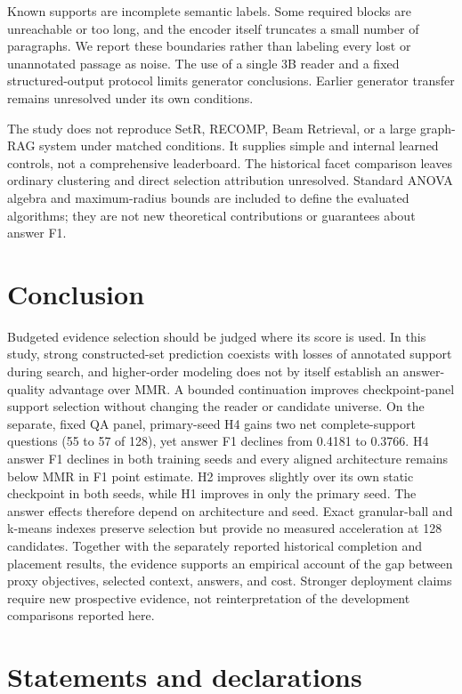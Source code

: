 \documentclass[pdflatex,sn-mathphys-num]{sn-jnl}
\begin{document}
Known supports are incomplete semantic labels. Some required blocks are
unreachable or too long, and the encoder itself truncates a small number of
paragraphs. We report these boundaries rather than labeling every lost or
unannotated passage as noise. The use of a single 3B reader and a fixed
structured-output protocol limits generator conclusions. Earlier generator
transfer remains unresolved under its own conditions.

The study does not reproduce SetR, RECOMP, Beam Retrieval, or a large
graph-RAG system under matched conditions. It supplies simple and internal
learned controls, not a comprehensive leaderboard. The historical facet
comparison leaves ordinary clustering and direct selection attribution
unresolved. Standard ANOVA algebra and maximum-radius bounds are included
to define the evaluated algorithms; they are not new theoretical
contributions or guarantees about answer F1.

\section{Conclusion}
Budgeted evidence selection should be judged where its score is used.
In this study, strong constructed-set prediction coexists with losses of
annotated support during search, and higher-order modeling does not by
itself establish an answer-quality advantage over MMR. A bounded continuation
improves checkpoint-panel support selection without changing the reader or
candidate universe. On the separate, fixed QA panel, primary-seed H4 gains
two net complete-support questions (55 to 57 of 128), yet answer F1 declines
from 0.4181 to 0.3766. H4 answer F1 declines in both training seeds and
every aligned architecture remains below MMR in F1 point estimate.
H2 improves slightly over its own static checkpoint in both seeds, while
H1 improves in only the primary seed. The answer effects therefore depend
on architecture and seed. Exact granular-ball and k-means indexes
preserve selection but provide no measured acceleration at 128 candidates.
Together with the separately reported historical completion and placement
results, the evidence supports an empirical account of the gap between
proxy objectives, selected context, answers, and cost. Stronger deployment
claims require new prospective evidence, not reinterpretation of the
development comparisons reported here.

\backmatter
\section*{Statements and declarations}
\end{document}
